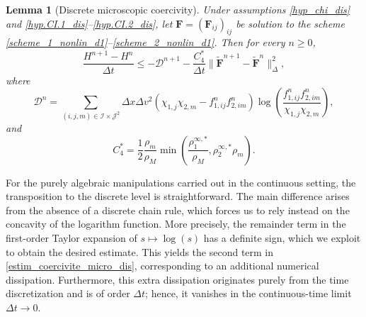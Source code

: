 \documentclass[reqno]{amsart}
\newtheorem{Lemma}{Lemma}
\newcommand{\Dt}{\Delta t}
\newcommand{\Dx}{\Delta x}
\newcommand{\Dv}{\Delta v}
\newcommand{\II}{\mathcal{I}}
\newcommand{\J}{\mathcal{J}}
\newcommand{\Ft}{{\widetilde{F}}}
\newcommand{\Ftbf}{\mathbf{\Ft}}
\newcommand{\Fbf}{\mathbf{F}}
\numberwithin{equation}{section}
\begin{document}
\begin{Lemma}[Discrete microscopic coercivity]\label{lem_disc_microcoercivity}
    Under assumptions \eqref{hyp_chi_dis} and \eqref{hyp.CI.1_dis}--\eqref{hyp.CI.2_dis}, let $\Fbf=(\Fbf_{ij})_{ij}$ be solution to the scheme \eqref{scheme_1_nonlin_d1}--\eqref{scheme_2_nonlin_d1}. Then for every $n\geq 0$, 
    \begin{equation}\label{estim_coercivite_micro_dis}
        \frac{H^{n+1} - H^n}{\Delta t} \leq -  \mathcal{D}^{n+1}-\frac{C_{4}^*}{\Delta t}\|\Ftbf^{n+1}-\Ftbf^n\|_{\Delta}^2,
    \end{equation}
    where
    \begin{equation}\label{def.D_d}
        \mathcal{D}^n = \sum_{(i,j,m)\in\II\times\J^2}\Dx\Dv^2 \left(\chi_{1,j}\chi_{2,m} - f_{1,ij}^nf_{2,im}^n\right)\log\left(\frac{f_{1,ij}^nf_{2,im}^n}{\chi_{1,j}\chi_{2,m}}\right),
    \end{equation}
    and 
    \[C_{4}^*=\frac{1}{2}\frac{\rho_m}{\rho_M}\min\left(\frac{\rho_1^{\infty,*}}{\rho_M},\rho_2^{\infty,*}\rho_m\right).\]
\end{Lemma}
For the purely algebraic manipulations carried out in the continuous setting, the transposition to the discrete level is straightforward. The main difference arises from the absence of a discrete chain rule, which forces us to rely instead on the concavity of the logarithm function. More precisely, the remainder term in the first-order Taylor expansion of $s \mapsto \log(s)$ has a definite sign, which we exploit to obtain the desired estimate. This yields the second term in \eqref{estim_coercivite_micro_dis}, corresponding to an additional numerical dissipation. Furthermore, this extra dissipation originates purely from the time discretization and is of order $\Dt$; hence, it vanishes in the continuous-time limit $\Dt \to 0$.
\end{document}
